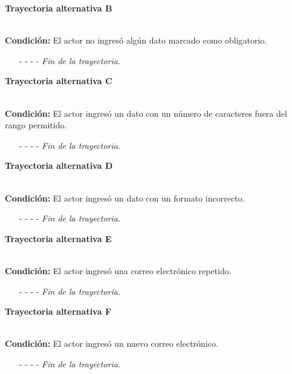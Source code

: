 \hypertarget{CU3-2:TAB}{\textbf{Trayectoria alternativa B}}\\
\noindent \textbf{Condición:} El actor no ingresó algún dato marcado como obligatorio.
\begin{enumerate}
	\UCpaso[\UCsist] Muestra el mensaje  señalando el campo que presenta el error en la pantalla .
	\UCpaso Regresa al paso \ref{CU3.2-P5} de la trayectoria principal.
	\item[- -] - - {\em {Fin de la trayectoria}}.%
\end{enumerate}
\hypertarget{CU3-2:TAC}{\textbf{Trayectoria alternativa C}}\\
\noindent \textbf{Condición:} El actor ingresó un dato con un número de caracteres fuera del rango permitido.
\begin{enumerate}
	\UCpaso[\UCsist] Muestra el mensaje  señalando el campo que presenta el error en la pantalla .
	\UCpaso Regresa al paso \ref{CU3.2-P5} de la trayectoria principal.
	\item[- -] - - {\em {Fin de la trayectoria}}.%
\end{enumerate}
\hypertarget{CU3-2:TAD}{\textbf{Trayectoria alternativa D}}\\
\noindent \textbf{Condición:} El actor ingresó un dato con un formato incorrecto.
\begin{enumerate}
	\UCpaso[\UCsist] Muestra el mensaje  señalando el campo que presenta el error en la pantalla .
	\UCpaso Regresa al paso \ref{CU3.2-P5} de la trayectoria principal.
	\item[- -] - - {\em {Fin de la trayectoria}}.
\end{enumerate}
\hypertarget{CU3-2:TAE}{\textbf{Trayectoria alternativa E}}\\
\noindent \textbf{Condición:} El actor ingresó una correo electrónico repetido.
\begin{enumerate}
	\UCpaso[\UCsist] Muestra el mensaje  señalando el campo que presenta la duplicidad en la pantalla.
	\UCpaso Regresa al paso \ref{CU3.2-P5} de la trayectoria principal.
	\item[- -] - - {\em {Fin de la trayectoria}}.
\end{enumerate}

\hypertarget{CU3-2:TAF}{\textbf{Trayectoria alternativa F}}\\
\noindent \textbf{Condición:} El actor ingresó un nuevo correo electrónico.
\begin{enumerate}
	\UCpaso[\UCsist] Envía un correo con el mensaje  a la nueva cuenta de correo electrónico proporcionada por el actor.
	\UCpaso Regresa al paso \ref{CU3.2-P10} de la trayectoria principal.
	\item[- -] - - {\em {Fin de la trayectoria}}.
\end{enumerate}